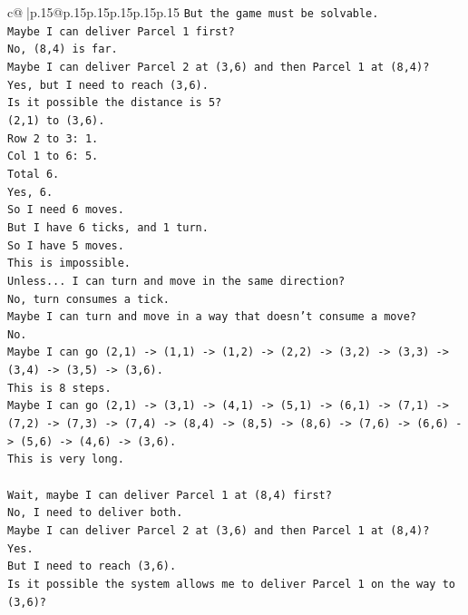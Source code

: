 \documentclass{article}
\begin{document}
{\begin{supertabular}{c@{$\;$}|p{.15\linewidth}@{}p{.15\linewidth}p{.15\linewidth}p{.15\linewidth}p{.15\linewidth}p{.15\linewidth}}
{{{\texttt{But the game must be solvable.} \\
\texttt{Maybe I can deliver Parcel 1 first?} \\
\texttt{No, (8,4) is far.} \\
\texttt{Maybe I can deliver Parcel 2 at (3,6) and then Parcel 1 at (8,4)?} \\
\texttt{Yes, but I need to reach (3,6).} \\
\texttt{Is it possible the distance is 5?} \\
\texttt{(2,1) to (3,6).} \\
\texttt{Row 2 to 3: 1.} \\
\texttt{Col 1 to 6: 5.} \\
\texttt{Total 6.} \\
\texttt{Yes, 6.} \\
\texttt{So I need 6 moves.} \\
\texttt{But I have 6 ticks, and 1 turn.} \\
\texttt{So I have 5 moves.} \\
\texttt{This is impossible.} \\
\texttt{Unless... I can turn and move in the same direction?} \\
\texttt{No, turn consumes a tick.} \\
\texttt{Maybe I can turn and move in a way that doesn't consume a move?} \\
\texttt{No.} \\
\texttt{Maybe I can go (2,1) {-}> (1,1) {-}> (1,2) {-}> (2,2) {-}> (3,2) {-}> (3,3) {-}> (3,4) {-}> (3,5) {-}> (3,6).} \\
\texttt{This is 8 steps.} \\
\texttt{Maybe I can go (2,1) {-}> (3,1) {-}> (4,1) {-}> (5,1) {-}> (6,1) {-}> (7,1) {-}> (7,2) {-}> (7,3) {-}> (7,4) {-}> (8,4) {-}> (8,5) {-}> (8,6) {-}> (7,6) {-}> (6,6) {-}> (5,6) {-}> (4,6) {-}> (3,6).} \\
\texttt{This is very long.} \\
\\ 
\texttt{Wait, maybe I can deliver Parcel 1 at (8,4) first?} \\
\texttt{No, I need to deliver both.} \\
\texttt{Maybe I can deliver Parcel 2 at (3,6) and then Parcel 1 at (8,4)?} \\
\texttt{Yes.} \\
\texttt{But I need to reach (3,6).} \\
\texttt{Is it possible the system allows me to deliver Parcel 1 on the way to (3,6)?} \\
}}}
\end{supertabular}}
\end{document}
